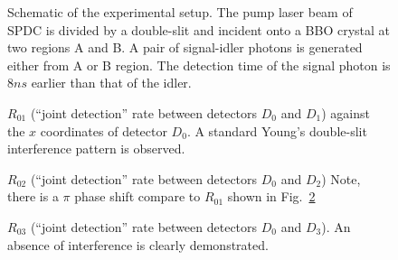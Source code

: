 \documentclass[pra,aps,epsf,12pt]{revtex4-2}
\begin{document}
\begin{figure}[tbp]
\centerline{\epsfxsize=2.7in } \caption{Schematic of the
experimental setup. The pump laser beam of SPDC is divided by a double-slit and incident
onto a BBO crystal at two regions A and B. A pair of signal-idler photons is generated
either from A or B region. The detection time of the signal photon is $8ns$ earlier than
that of the idler.}\label{fig:figure2}
\end{figure}

\begin{figure}[tbp]
\centerline{\epsfxsize=2.7in }
\caption{$R_{01}$ (``joint detection'' rate between detectors $D_{0}$ and $%
D_{1}$) against the $x$ coordinates of detector $D_{0}$. A standard Young's double-slit
interference pattern is observed.}\label{fig:figure3}
\end{figure}

\begin{figure}[tbp]
\centerline{\epsfxsize=2.7in }
\caption{$R_{02}$ (``joint detection'' rate between detectors $D_{0}$ and $%
D_{2}$) Note, there is a $\pi$ phase shift compare to $R_{01}$ shown in
Fig.~\ref{fig:figure3} }\label{fig:figure4}
\end{figure}

\begin{figure}[tbp]
\centerline{\epsfxsize=2.7in }
\caption{$R_{03}$ (``joint detection'' rate between detectors $D_{0}$ and $%
D_{3}$). An absence of interference is clearly demonstrated.}\label{fig:figure5}
\end{figure}
\end{document}
